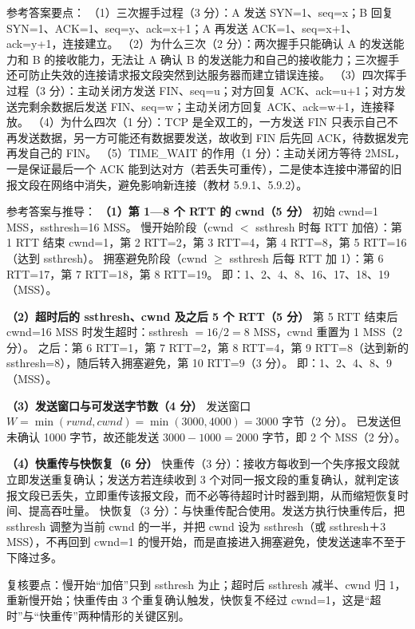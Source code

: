 \documentclass[a4paper,11pt]{article}
\begin{document}
\q 参考答案要点：
（1）三次握手过程（3 分）：A 发送 SYN=1、seq=x；B 回复 SYN=1、ACK=1、seq=y、ack=x+1；A 再发送 ACK=1、seq=x+1、ack=y+1，连接建立。
（2）为什么三次（2 分）：两次握手只能确认 A 的发送能力和 B 的接收能力，无法让 A 确认 B 的发送能力和自己的接收能力；三次握手还可防止失效的连接请求报文段突然到达服务器而建立错误连接。
（3）四次挥手过程（3 分）：主动关闭方发送 FIN、seq=u；对方回复 ACK、ack=u+1；对方发送完剩余数据后发送 FIN、seq=w；主动关闭方回复 ACK、ack=w+1，连接释放。
（4）为什么四次（1 分）：TCP 是全双工的，一方发送 FIN 只表示自己不再发送数据，另一方可能还有数据要发送，故收到 FIN 后先回 ACK，待数据发完再发自己的 FIN。
（5）TIME\_WAIT 的作用（1 分）：主动关闭方等待 2MSL，一是保证最后一个 ACK 能到达对方（若丢失可重传），二是使本连接中滞留的旧报文段在网络中消失，避免影响新连接（教材 5.9.1、5.9.2）。


\q 参考答案与推导：
\textbf{（1）第 1—8 个 RTT 的 cwnd（5 分）}
初始 cwnd=1 MSS，ssthresh=16 MSS。
慢开始阶段（cwnd $<$ ssthresh 时每 RTT 加倍）：第 1 RTT 结束 cwnd=1，第 2 RTT=2，第 3 RTT=4，第 4 RTT=8，第 5 RTT=16（达到 ssthresh）。
拥塞避免阶段（cwnd $\ge$ ssthresh 后每 RTT 加 1）：第 6 RTT=17，第 7 RTT=18，第 8 RTT=19。
即：1、2、4、8、16、17、18、19（MSS）。

\textbf{（2）超时后的 ssthresh、cwnd 及之后 5 个 RTT（5 分）}
第 5 RTT 结束后 cwnd=16 MSS 时发生超时：ssthresh $=16/2=8$ MSS，cwnd 重置为 1 MSS（2 分）。
之后：第 6 RTT=1，第 7 RTT=2，第 8 RTT=4，第 9 RTT=8（达到新的 ssthresh=8），随后转入拥塞避免，第 10 RTT=9（3 分）。
即：1、2、4、8、9（MSS）。

\textbf{（3）发送窗口与可发送字节数（4 分）}
发送窗口 $W=\min(rwnd,cwnd)=\min(3000,4000)=3000$ 字节（2 分）。
已发送但未确认 1000 字节，故还能发送 $3000-1000=2000$ 字节，即 2 个 MSS（2 分）。

\textbf{（4）快重传与快恢复（6 分）}
快重传（3 分）：接收方每收到一个失序报文段就立即发送重复确认；发送方若连续收到 3 个对同一报文段的重复确认，就判定该报文段已丢失，立即重传该报文段，而不必等待超时计时器到期，从而缩短恢复时间、提高吞吐量。
快恢复（3 分）：与快重传配合使用。发送方执行快重传后，把 ssthresh 调整为当前 cwnd 的一半，并把 cwnd 设为 ssthresh（或 ssthresh＋3 MSS），不再回到 cwnd=1 的慢开始，而是直接进入拥塞避免，使发送速率不至于下降过多。
\begin{analysis}复核要点：慢开始“加倍”只到 ssthresh 为止；超时后 ssthresh 减半、cwnd 归 1，重新慢开始；快重传由 3 个重复确认触发，快恢复不经过 cwnd=1，这是“超时”与“快重传”两种情形的关键区别。\end{analysis}
\end{document}
